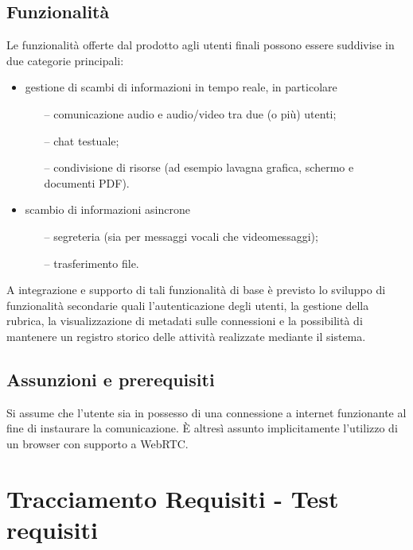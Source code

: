 \subsection{Funzionalità}
Le funzionalità offerte dal prodotto agli utenti finali possono essere suddivise in due categorie principali:
\begin{itemize}
  \item gestione di scambi di informazioni in tempo reale, in particolare
  \begin{itemize}
  \item[--] comunicazione audio e audio/video tra due (o più) utenti;
  \item[--] chat testuale;
  \item[--] condivisione di risorse (ad esempio lavagna grafica, schermo e documenti PDF). 
  \end{itemize}
  \item scambio di informazioni asincrone 
  \begin{itemize}
  \item[--] segreteria (sia per messaggi vocali che videomessaggi);
  \item[--] trasferimento file.
  \end{itemize}
\end{itemize}
A integrazione e supporto di tali funzionalità di base è previsto lo sviluppo di funzionalità secondarie quali l'autenticazione degli utenti, la gestione della rubrica, la visualizzazione di metadati sulle connessioni e la possibilità di mantenere un registro storico delle attività realizzate mediante il sistema.

\subsection{Assunzioni e prerequisiti}
Si assume che l'utente sia in possesso di una connessione a internet funzionante al fine di instaurare la comunicazione. È altresì assunto implicitamente l'utilizzo di un browser con supporto a WebRTC.

\clearpage


\section{Tracciamento Requisiti - Test requisiti}\label{sec:tracciamento test}

